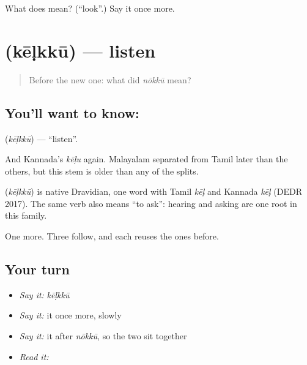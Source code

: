 \begin{tcolorbox}[breakable,colback=teal!4,colframe=teal!35!black,title={Before you move on}]
What does  mean? (\textquotedblleft{}look\textquotedblright{}.) Say it once more.
\end{tcolorbox}
\section[\texorpdfstring{\ml{കേൾക്കൂ} (kēḷkkū)}{കേൾക്കൂ (kēḷkkū)}]{ (kēḷkkū) — listen}

\label{lesson:ML-C44-listen}



\begin{quote}
Before the new one: what did \emph{nōkkū} mean?
\end{quote}

\subsection*{You'll want to know: }
\textbf{} (\emph{kēḷkkū}) — \textquotedblleft{}listen\textquotedblright{}.

And Kannada's \emph{kēḷu} again. Malayalam separated from Tamil later than the others, but this stem is older than any of the splits.

\begin{cousinweb}
\textbf{} (\emph{kēḷkkū}) is native Dravidian, one word with Tamil \emph{kēḷ} and Kannada \emph{kēḷ} (DEDR 2017). The same verb also means \textquotedblleft{}to ask\textquotedblright{}: hearing and asking are one root in this family.
\end{cousinweb}

\begin{grammarlens}[title={What you've built}]
One more. Three follow, and each reuses the ones before.
\end{grammarlens}

\subsection*{Your turn}
\begin{itemize}
\raggedright
  \item \emph{Say it:} \emph{kēḷkkū}
  \item \emph{Say it:} it once more, slowly
  \item \emph{Say it:} it after \emph{nōkkū}, so the two sit together
  \item \emph{Read it:} \textbf{}
\end{itemize}

